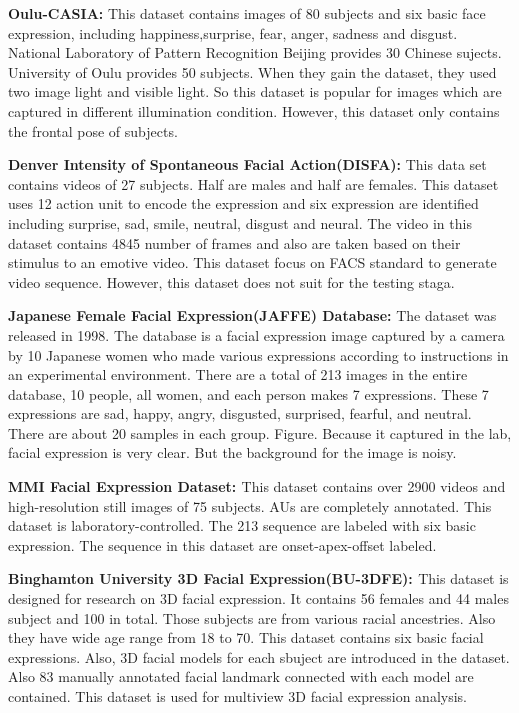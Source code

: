 \textbf{Oulu-CASIA:\citep{zhao2011facial}} This dataset contains images of 80 subjects and six basic face expression, including happiness,surprise, fear, anger, sadness and disgust. National Laboratory of Pattern Recognition Beijing provides 30 Chinese sujects. University of Oulu provides 50 subjects. When they gain the dataset, they used two image light and visible light. So this dataset is popular for images which are captured in different illumination condition. However, this dataset only contains the frontal pose of subjects. 

\textbf{Denver Intensity of Spontaneous Facial Action(DISFA):\citep{mavadati2013disfa}} This data set contains videos of 27 subjects. Half are males and half are females. This dataset uses 12 action unit to encode the expression and six expression are identified including surprise, sad, smile, neutral, disgust and neural. The video in this dataset contains 4845 number of frames and also are taken based on their stimulus to an emotive video. This dataset focus on FACS standard to generate video sequence. However, this dataset does not suit for the testing staga.

\textbf{Japanese Female Facial Expression(JAFFE) Database:\citep{lyons1998coding}} The dataset was released in 1998. The database is a facial expression image captured by a camera by 10 Japanese women who made various expressions according to instructions in an experimental environment. There are a total of 213 images in the entire database, 10 people, all women, and each person makes 7 expressions. These 7 expressions are sad, happy, angry, disgusted, surprised, fearful, and neutral. There are about 20 samples in each group. Figure. Because it captured in the lab, facial expression is very clear. But the background for the image is noisy.

\textbf{MMI Facial Expression Dataset: \citep{pantic2005web} } This dataset contains over 2900 videos and high-resolution still images of 75 subjects. AUs are completely annotated. This dataset is laboratory-controlled. The 213 sequence are labeled with six basic expression. The sequence in this dataset are onset-apex-offset labeled.

\textbf{Binghamton University 3D Facial Expression(BU-3DFE): \citep{yin20063d}} This dataset is designed for research on 3D facial expression. It contains 56 females and 44 males subject and 100 in total. Those subjects are from various racial ancestries. Also they have wide age range from 18 to 70. This dataset contains six basic facial expressions. Also, 3D facial models for each sbuject are introduced in the dataset. Also 83 manually annotated facial landmark connected with each model are contained. This dataset is used for multiview 3D facial expression analysis.

